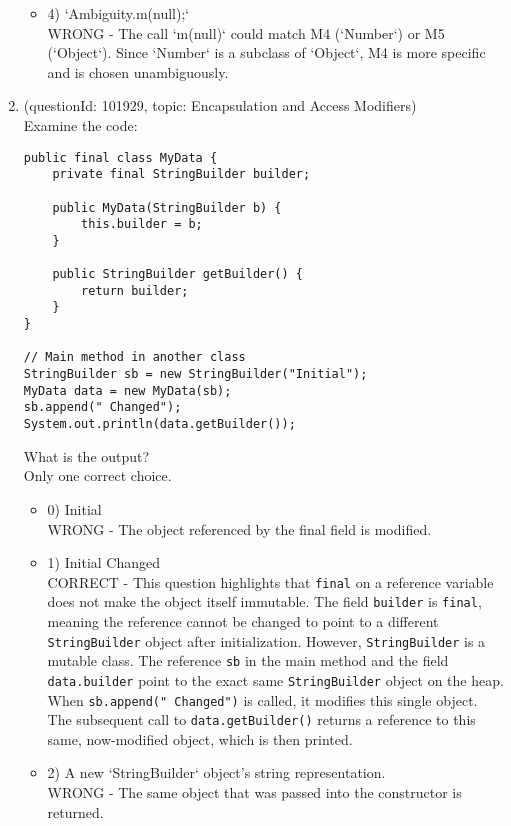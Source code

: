 \documentclass[12pt]{article}
\begin{document}
\begin{enumerate}[label=(\arabic*)]
\begin{itemize}
\item 4) `Ambiguity.m(null);`
 \\ 
WRONG - The call `m(null)` could match M4 (`Number`) or M5 (`Object`). Since `Number` is a subclass of `Object`, M4 is more specific and is chosen unambiguously.

\end{itemize}
\item (questionId: 101929, topic: Encapsulation and Access Modifiers) \\ 
Examine the code:
\begin{verbatim}
public final class MyData {
    private final StringBuilder builder;

    public MyData(StringBuilder b) {
        this.builder = b;
    }

    public StringBuilder getBuilder() {
        return builder;
    }
}

// Main method in another class
StringBuilder sb = new StringBuilder("Initial");
MyData data = new MyData(sb);
sb.append(" Changed");
System.out.println(data.getBuilder());
\end{verbatim}
What is the output?
\\ \noindent Only one correct choice. 
\begin{itemize}
\item 0) Initial
 \\ 
WRONG - The object referenced by the final field is modified.

\item 1) Initial Changed
 \\ 
CORRECT - This question highlights that \verb|final| on a reference variable does not make the object itself immutable. The field \verb|builder| is \verb|final|, meaning the reference cannot be changed to point to a different \verb|StringBuilder| object after initialization. However, \verb|StringBuilder| is a mutable class. The reference \verb|sb| in the main method and the field \verb|data.builder| point to the exact same \verb|StringBuilder| object on the heap. When \verb|sb.append(" Changed")| is called, it modifies this single object. The subsequent call to \verb|data.getBuilder()| returns a reference to this same, now-modified object, which is then printed.

\item 2) A new `StringBuilder` object's string representation.
 \\ 
WRONG - The same object that was passed into the constructor is returned.


\end{itemize}
\end{enumerate}
\end{document}
